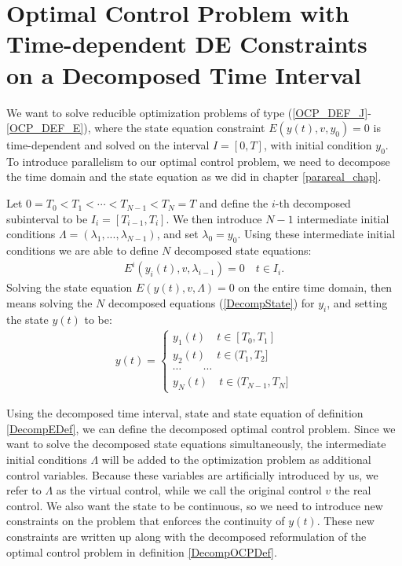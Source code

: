 \section{Optimal Control Problem with Time-dependent DE Constraints on a Decomposed Time Interval} \label{decomp_sec}
We want to solve reducible optimization problems of type (\ref{OCP_DEF_J}-\ref{OCP_DEF_E}), where the state equation constraint $E(y(t),v,y_0)=0$ is time-dependent and solved on the interval $I=[0,T]$, with initial condition $y_0$. To introduce parallelism to our optimal control problem, we need to decompose the time domain and the state equation as we did in chapter \ref{parareal_chap}. 
\begin{definition} \label{DecompEDef}
Let $0=T_0<T_1<\cdots<T_{N-1}<T_N=T$ and define the $i$-th decomposed subinterval to be $I_i=[T_{i-1},T_i]$. We then introduce $N-1$ intermediate initial conditions $\Lambda=(\lambda_1,...,\lambda_{N-1})$, and set $\lambda_0=y_0$. Using these intermediate initial conditions we are able to define $N$ decomposed state equations:
\begin{align}
E^i(y_i(t),v,\lambda_{i-1})= 0 \quad t\in I_i. \label{DecompState}
\end{align} 
Solving the state equation $E(y(t),v,\Lambda)=0$ on the entire time domain, then means solving the $N$ decomposed equations (\ref{DecompState}) for $y_i$, and setting the state $y(t)$ to be:
\begin{align}
 y(t)=\left\{
     \begin{array}{lr}
		y_1(t)\quad t\in [T_0,T_1] \\
		y_2(t)\quad t\in(T_1,T_2] \\
		\cdots \quad\quad\cdots\\
		y_N(t)\quad t\in(T_{N-1},T_N]
	\end{array}
   \right.	\label{GatherState}
\end{align}
\end{definition}
\noindent
Using the decomposed time interval, state and state equation of definition \ref{DecompEDef}, we can define the decomposed optimal control problem. Since we want to solve the decomposed state equations simultaneously, the intermediate initial conditions $\Lambda$ will be added to the optimization problem as additional control variables. Because these variables are artificially introduced by us, we refer to $\Lambda$ as the virtual control, while we call the original control $v$ the real control. We also want the state to be continuous, so we need to introduce new constraints on the problem that enforces the continuity of $y(t)$. These new constraints are written up along with the decomposed reformulation of the optimal control problem in definition \ref{DecompOCPDef}.
